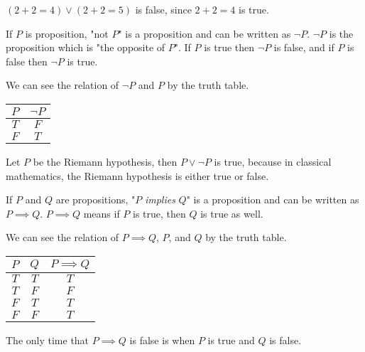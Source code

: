 \documentclass[a4paper]{article}
\begin{document}
\begin{eg}
$(2 + 2 = 4) \lor (2 + 2 = 5)$ is false, since $2 + 2 = 4$ is true.
\end{eg}

\begin{defi}[Not]
If $P$ is proposition, "not $P$" is a proposition and can be written as $\neg P$. $\neg P$ is the proposition which is "the opposite of $P$". If $P$ is true then $\neg P$ is false, and if $P$ is false then $\neg P$ is true.
\end{defi}

We can see the relation of $\neg P$ and $P$ by the truth table.

\begin{center}
	\begin{tabular}{|c|c|}
		\hline
		$P$ & $\neg P$\\
		\hline
		$T$ & $F$\\
		\hline
		$F$ & $T$\\
		\hline
	\end{tabular}
\end{center}

\begin{eg}
Let $P$ be the Riemann hypothesis, then $P \lor \neg P$ is true, because in classical mathematics, the Riemann hypothesis is either true or false.
\end{eg}

\begin{defi}[Implies]
If $P$ and $Q$ are propositions, "$P$ \emph{implies} $Q$" is a proposition and can be written as $P \implies Q$. $P \implies Q$ means if $P$ is true, then $Q$ is true as well.
\end{defi}

We can see the relation of $P \implies Q$, $P$, and $Q$ by the truth table.

\begin{center}
	\begin{tabular}{|c|c|c|}
		\hline
		$P$ & $Q$ & $P \implies Q$\\
		\hline
		$T$ & $T$ & $T$\\
		\hline
		$T$ & $F$ & $F$\\
		\hline
		$F$ & $T$ & $T$\\
		\hline
		$F$ & $F$ & $T$\\
		\hline
	\end{tabular}
\end{center}

The only time that $P \implies Q$ is false is when $P$ is true and $Q$ is false.
\end{document}
